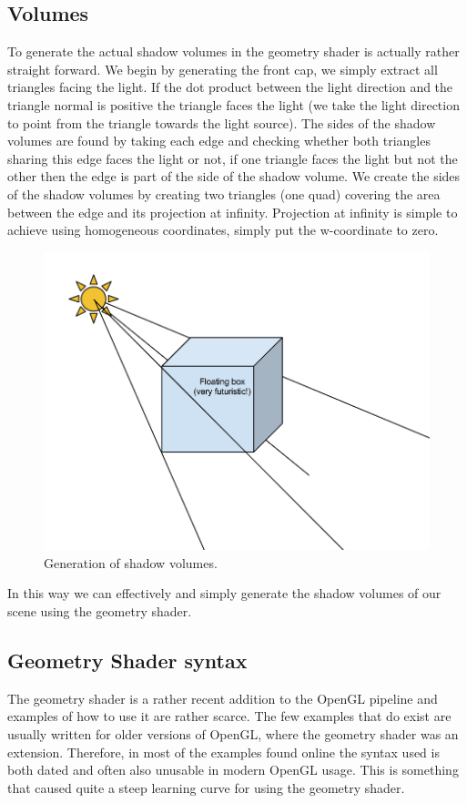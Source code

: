 \documentclass[a4paper, 12pt]{article}
\begin{document}
\subsection{Volumes}
To generate the actual shadow volumes in the geometry shader is actually rather straight forward. We begin by generating the front cap, we simply extract all triangles facing the light. If the dot product between the light direction and the triangle normal is positive the triangle faces the light (we take the light direction to point from the triangle towards the light source). The sides of the shadow volumes are found by taking each edge and checking whether both triangles sharing this edge faces the light or not, if one triangle faces the light but not the other then the edge is part of the side of the shadow volume. We create the sides of the shadow volumes by creating two triangles (one quad) covering the area between the edge and its projection at infinity. Projection at infinity is simple to achieve using homogeneous coordinates, simply put the w-coordinate to zero.
\begin{figure}[h]
\centering
\includegraphics[width=\textwidth]{volume_gen.png}
\caption{Generation of shadow volumes. }
\label{fig:gener}
\end{figure}

In this way we can effectively and simply generate the shadow volumes of our scene using the geometry shader.

\subsection{Geometry Shader syntax}
The geometry shader is a rather recent addition to the OpenGL pipeline and examples of how to use it are rather scarce. The few examples that do exist are usually written for older versions of OpenGL, where the geometry shader was an extension. Therefore, in most of the examples found online the syntax used is both dated and often also unusable in modern OpenGL usage. This is something that caused quite a steep learning curve for using the geometry shader.
\end{document}
